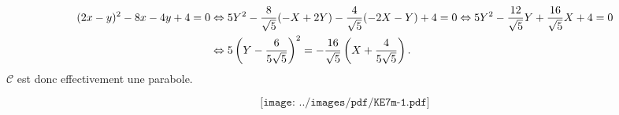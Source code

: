{{\begin{align*}\ensuremath
(2x-y)^2-8x-4y+4=0&\Leftrightarrow5Y^2-\frac{8}{\sqrt{5}}(-X+2Y)-\frac{4}{\sqrt{5}}(-2X-Y)+4=0\Leftrightarrow5Y^2-\frac{12}{\sqrt{5}}Y+\frac{16}{\sqrt{5}}X+4=0\\
 &\Leftrightarrow5\left(Y-\frac{6}{5\sqrt{5}}\right)^2=-\frac{16}{\sqrt{5}}\left(X+\frac{4}{5\sqrt{5}}\right).
\end{align*}
$\mathcal{C}$ est donc effectivement une parabole.

$$\texttt{[image: ../images/pdf/KE7m-1.pdf]}$$
}
}
